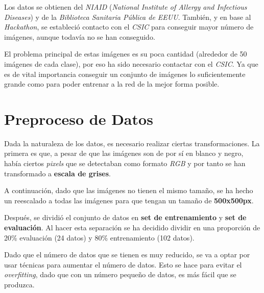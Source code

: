 \documentclass{uc3mpracticas}
\begin{document}
  \vspace{5mm}

  Los datos se obtienen del \textit{NIAID} (\textit{National Institute of Allergy and Infectious Diseases}) y de la \textit{Biblioteca Sanitaria Pública de EEUU}. También, y en base al \textit{Hackathon}, se estableció contacto con el \textit{CSIC} para conseguir mayor número de imágenes, aunque todavía no se han conseguido.

  \vspace{4mm}

  El problema principal de estas imágenes es su poca cantidad (alrededor de 50 imágenes de cada clase), por eso ha sido necesario contactar con el \textit{CSIC}. Ya que es de vital importancia conseguir un conjunto de imágenes lo suficientemente grande como para poder entrenar a la red de la mejor forma posible.

  \newpage

  \section{Preproceso de Datos}

  Dada la naturaleza de los datos, es necesario realizar ciertas transformaciones. La primera es que, a pesar de que las imágenes son de por sí en blanco y negro, había ciertos \textit{pixels} que se detectaban como formato \textit{RGB} y por tanto se han transformado a \textbf{escala de grises}.

  \vspace{2mm}

  A continuación, dado que las imágenes no tienen el mismo tamaño, se ha hecho un reescalado a todas las imágenes para que tengan un tamaño de \textbf{500x500px}.

  \vspace{4mm}

  Después, se dividió el conjunto de datos en \textbf{set de entrenamiento} y \textbf{set de evaluación}. Al hacer esta separación se ha decidido dividir en una proporción de 20\% evaluación (24 datos) y 80\% entrenamiento (102 datos).

  \vspace{4mm}

  Dado que el número de datos que se tienen es muy reducido, se va a optar por usar técnicas para aumentar el número de datos. Esto se hace para evitar el \textit{overfitting}, dado que con un número pequeño de datos, es más fácil que se produzca.

  \vspace{2mm}
\end{document}
